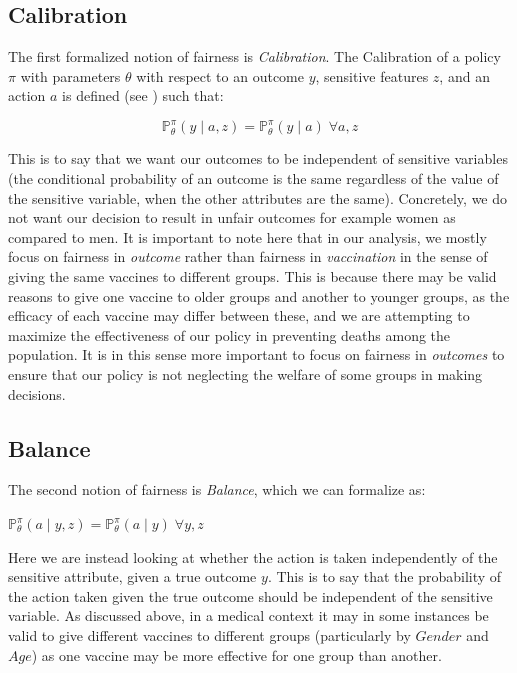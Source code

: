 \documentclass{article}
\begin{document}
\subsection{Calibration}
\label{sec: Calibration}
The first formalized notion of fairness is \textit{Calibration}. The Calibration of a policy $\pi$ with parameters $\theta$ with respect to an outcome $y$, sensitive features $z$, and an action $a$ is defined (see \textcolor{blue}{\cite{Dimitrakakis}}) such that: 

\begin{equation}
\label{eq: Calibration}
    \mathbb{P}^\pi_\theta(y\;|\;a,z) = \mathbb{P}^\pi_\theta(y\;|\;a) \; \forall a, z
\end{equation}


This is to say that we want our outcomes to be independent of sensitive variables (the conditional probability of an outcome is the same regardless of the value of the sensitive variable, when the other attributes are the same). Concretely, we do not want our decision to result in unfair outcomes for example women as compared to men. It is important to note here that in our analysis, we mostly focus on fairness in \textit{outcome} rather than fairness in \textit{vaccination} in the sense of giving the same vaccines to different groups. This is because there may be valid reasons to give one vaccine to older groups and another to younger groups, as the efficacy of each vaccine may differ between these, and we are attempting to maximize the effectiveness of our policy in preventing deaths among the population. It is in this sense more important to focus on fairness in \textit{outcomes} to ensure that our policy is not neglecting the welfare of some groups in making decisions.

\subsection{Balance}
\label{sec: Balance}
The second notion of fairness is \textit{Balance}, which we can formalize as:

\begin{center}
$\mathbb{P}^\pi_\theta(a\;|\;y,z) = \mathbb{P}^\pi_\theta(a\;|\;y) \; \forall y, z$
\end{center}

Here we are instead looking at whether the action is taken independently of the sensitive attribute, given a true outcome $y$. This is to say that the probability of the action taken given the true outcome should be independent of the sensitive variable. As discussed above, in a medical context it may in some instances be valid to give different vaccines to different groups (particularly by $Gender$ and $Age$) as one vaccine may be more effective for one group than another.
\end{document}
